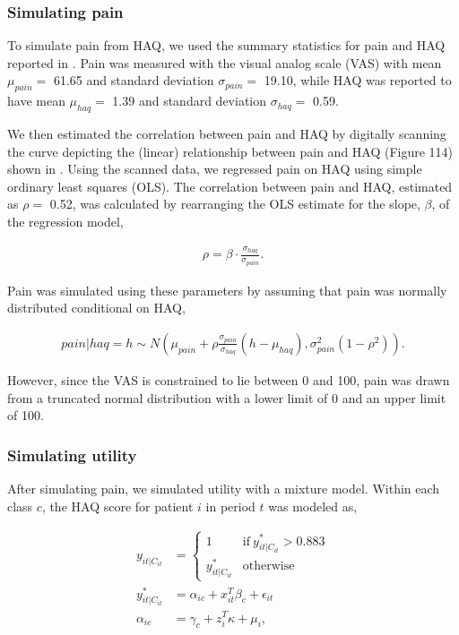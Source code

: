 \documentclass[11pt,final,fleqn]{article}
\theoremstyle{plain}
\begin{document}
\begin{appendices}
\subsubsection{Simulating pain}
To simulate pain from HAQ, we used the summary statistics for pain and HAQ reported in \citet{sarzi2002correlation}. Pain was measured with the visual analog scale (VAS) with mean  $\mu_{pain} =$ 61.65 and standard deviation $\sigma_{pain} =$ 19.10, while HAQ was reported to have mean $\mu_{haq} =$ 1.39 and standard deviation $\sigma_{haq} =$ 0.59. 

We then estimated the correlation between pain and HAQ by digitally scanning the curve depicting the (linear) relationship between pain and HAQ (Figure 114) shown in \citet{stevenson2016adalimumab}. Using the scanned data, we regressed pain on HAQ using simple ordinary least squares (OLS). The correlation between pain and HAQ, estimated as $\rho =$ 0.52, was calculated by rearranging the OLS estimate for the slope, $\beta$, of the regression model,

\begin{align}
\rho = \beta \cdot \frac{\sigma_{haq}}{\sigma_{pain}}.
\end{align}

Pain was simulated using these parameters by assuming that pain was normally distributed conditional on HAQ,

\begin{align}
pain | haq = h \sim N\left (\mu_{pain} + \rho \frac{\sigma_{pain}}{\sigma_{haq}}(h - \mu_{haq}), \sigma^2_{pain}(1 - \rho^2)\right).
\end{align}

However, since the VAS is constrained to lie between 0 and 100, pain was drawn from a truncated normal distribution with a lower limit of 0 and an upper limit of 100. 

\subsubsection{Simulating utility}
After simulating pain, we simulated utility with a mixture model. Within each class $c$, the HAQ score for patient $i$ in period $t$ was modeled as,

\begin{align}
y_{it|C_{it}} &= 
\begin{cases}
  1 & \text{if}\  y^{*}_{it|C_{it}}>0.883 \\
  y^{*}_{it|C_{it}} & \text{otherwise}
\end{cases}\\
y^{*}_{it|C_{it}} &= \alpha_{ic} +  x_{it}^T\beta_{c} + \epsilon_{it}\\
\alpha_{ic} &=  \gamma_{c} + z_{i}^T\kappa + \mu_{i},
\end{align}


\end{appendices}
\end{document}
